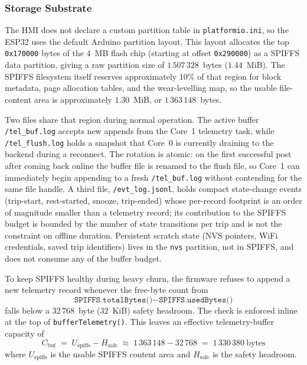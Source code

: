 \subsubsection{Storage Substrate}
\label{sec:offline_storage_substrate}

The HMI does not declare a custom partition table in \texttt{platformio.ini}, so the ESP32 uses the default Arduino partition layout. This layout allocates the top \texttt{0x170000} bytes of the 4~MB flash chip (starting at offset \texttt{0x290000}) as a SPIFFS data partition, giving a raw partition size of $1\,507\,328$~bytes ($1.44$~MiB). The SPIFFS filesystem itself reserves approximately 10\% of that region for block metadata, page allocation tables, and the wear-levelling map, so the usable file-content area is approximately $1.30$~MiB, or $1\,363\,148$~bytes.

Two files share that region during normal operation. The active buffer \texttt{/tel\_buf.log} accepts new appends from the Core~1 telemetry task, while \texttt{/tel\_flush.log} holds a snapshot that Core~0 is currently draining to the backend during a reconnect. The rotation is atomic: on the first successful post after coming back online the buffer file is renamed to the flush file, so Core~1 can immediately begin appending to a fresh \texttt{/tel\_buf.log} without contending for the same file handle. A third file, \texttt{/evt\_log.jsonl}, holds compact state-change events (trip-start, rest-started, snooze, trip-ended) whose per-record footprint is an order of magnitude smaller than a telemetry record; its contribution to the SPIFFS budget is bounded by the number of state transitions per trip and is not the constraint on offline duration. Persistent scratch state (NVS pointers, WiFi credentials, saved trip identifiers) lives in the \texttt{nvs} partition, not in SPIFFS, and does not consume any of the buffer budget.

To keep SPIFFS healthy during heavy churn, the firmware refuses to append a new telemetry record whenever the free-byte count from
\[
\texttt{SPIFFS.totalBytes()} - \texttt{SPIFFS.usedBytes()}
\]
falls below a $32\,768$~byte ($32$~KiB) safety headroom. The check is enforced inline at the top of \texttt{bufferTelemetry()}. This leaves an effective telemetry-buffer capacity of
\begin{equation}
\label{eq:offline_capacity_bytes}
C_{\mathrm{buf}} \;=\; U_{\mathrm{spiffs}} - H_{\mathrm{safe}} \;\approx\; 1\,363\,148 - 32\,768 \;=\; 1\,330\,380\ \text{bytes}
\end{equation}
where $U_{\mathrm{spiffs}}$ is the usable SPIFFS content area and $H_{\mathrm{safe}}$ is the safety headroom.

